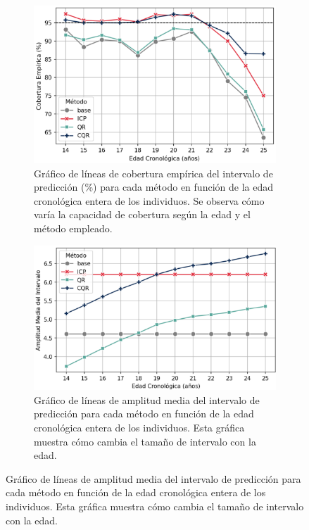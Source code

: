 \begin{figure}[htbp]
    \centering

    \begin{subfigure}[b]{0.9\textwidth}
        \centering
        \includegraphics[width=\textwidth]{capitulos/cap_05/imagenes/AE_EC_by_true_age.png}
        \caption{
            Gráfico de líneas de cobertura empírica del intervalo de predicción (\%) para cada método en función de la edad cronológica entera de los individuos. Se observa cómo varía la capacidad de cobertura según la edad y el método empleado.
        }
        \label{fig:AE_EC_by_true_age}
    \end{subfigure}

    \vspace{0.5cm}
    
    \begin{subfigure}[b]{0.9\textwidth}
        \centering
        \includegraphics[width=\textwidth]{capitulos/cap_05/imagenes/AE_MPIW_by_true_age.png}
        \caption{
            Gráfico de líneas de amplitud media del intervalo de predicción para cada método en función de la edad cronológica entera de los individuos. Esta gráfica muestra cómo cambia el tamaño de intervalo con la edad.
        }
        \label{fig:AE_MPIW_by_true_age}
    \end{subfigure}


\end{figure}
